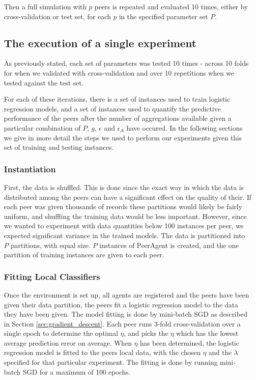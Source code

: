 Then a full simulation with $p$ peers is repeated and evaluated 10 times, either by cross-validation or test set, for each $p$ in the specified parameter set $P$. 

\subsection{The execution of a single experiment}

As previously stated, each set of parameters was tested 10 times - across 10 folds for when we validated with cross-validation and over 10 repetitions when we tested against the test set.

For each of these iterations, there is a set of instances used to train logistic regression models, and a set of instances used to quantify the predictive performance of the peers after the number of aggregations available given a particular combination of $P$, $g$, $\epsilon$ and $\epsilon_A$ have occured. In the following sections we give in more detail the steps we used to perform our experiments given this set of training and testing instances.

\subsubsection{Instantiation}


First, the data is shuffled. This is done since the exact way in which the data is distributed among the peers can have a significant effect on the quality of their. If each peer was given thousands of records these partitions would likely be fairly uniform, and shuffling the training data would be less important. However, since we wanted to experiment with data quantities below 100 instances per peer, we expected significant variance in the trained models. The data is partitioned into $P$ partitions, with equal size. $P$ instances of PeerAgent is created, and the one partition of training instances are given to each peer.

\subsubsection{Fitting Local Classifiers}

Once the environment is set up, all agents are registered and the peers have been given their data partition, the peers fit a logistic regression model to the data they have been given. The model fitting is done by mini-batch SGD as described in Section \ref{sec:gradient_descent}. Each peer runs 3-fold cross-validation over a single epoch to determine the optimal $\eta$, and picks the $\eta$ which has the lowest average prediction error on average. When $\eta$ has been determined, the logistic regression model is fitted to the peers local data, with the chosen $\eta$ and the $\lambda$ specified for that particular experiment. The fitting is done by running mini-batch SGD for a maximum of 100 epochs.

